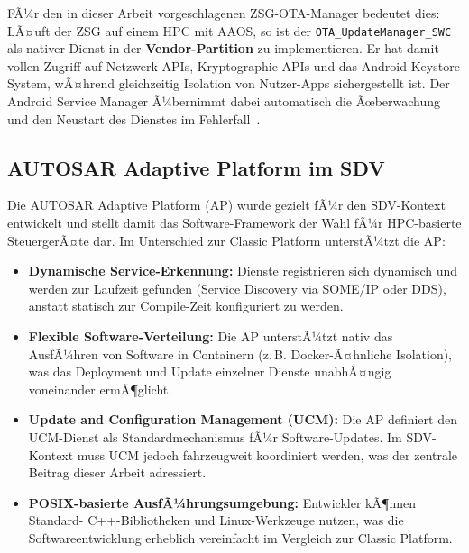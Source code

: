 ﻿\documentclass[12pt,a4paper,twoside]{article}
\begin{document}
FÃ¼r den in dieser Arbeit vorgeschlagenen ZSG-OTA-Manager bedeutet dies: LÃ¤uft
der ZSG auf einem HPC mit AAOS, so ist der \texttt{OTA\_UpdateManager\_SWC}
als nativer Dienst in der \textbf{Vendor-Partition} zu implementieren. Er hat
damit vollen Zugriff auf Netzwerk-APIs, Kryptographie-APIs und das Android Keystore
System, wÃ¤hrend gleichzeitig Isolation von Nutzer-Apps sichergestellt ist.
Der Android Service Manager Ã¼bernimmt dabei automatisch die Ãœberwachung und
den Neustart des Dienstes im Fehlerfall~\cite{schneider2026ladekomm}.

\subsection{AUTOSAR Adaptive Platform im SDV}
\label{subsec:autosar_adaptive_sdv}

Die AUTOSAR Adaptive Platform (AP) wurde gezielt fÃ¼r den SDV-Kontext entwickelt
und stellt damit das Software-Framework der Wahl fÃ¼r HPC-basierte SteuergerÃ¤te dar.
Im Unterschied zur Classic Platform unterstÃ¼tzt die AP:

\begin{itemize}
  \item \textbf{Dynamische Service-Erkennung:} Dienste registrieren sich dynamisch
    und werden zur Laufzeit gefunden (Service Discovery via SOME/IP oder DDS),
    anstatt statisch zur Compile-Zeit konfiguriert zu werden.
  \item \textbf{Flexible Software-Verteilung:} Die AP unterstÃ¼tzt nativ das
    AusfÃ¼hren von Software in Containern (z.\,B. Docker-Ã¤hnliche Isolation), was
    das Deployment und Update einzelner Dienste unabhÃ¤ngig voneinander ermÃ¶glicht.
  \item \textbf{Update and Configuration Management (UCM):} Die AP definiert
    den UCM-Dienst als Standardmechanismus fÃ¼r Software-Updates. Im SDV-Kontext
    muss UCM jedoch fahrzeugweit koordiniert werden, was der zentrale Beitrag
    dieser Arbeit adressiert.
  \item \textbf{POSIX-basierte AusfÃ¼hrungsumgebung:} Entwickler kÃ¶nnen Standard-
    C++-Bibliotheken und Linux-Werkzeuge nutzen, was die Softwareentwicklung
    erheblich vereinfacht im Vergleich zur Classic Platform.
\end{itemize}
\end{document}
